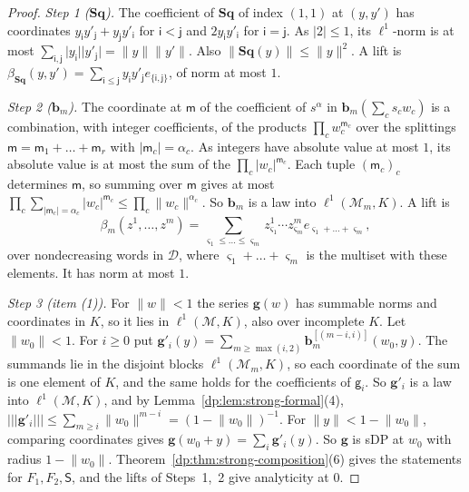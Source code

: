 \documentclass[11pt]{amsart}
\theoremstyle{definition}
\theoremstyle{remark}
\numberwithin{equation}{section}
\newcommand{\abs}[1]{\lvert #1\rvert}
\newcommand{\norm}[1]{\lVert #1\rVert}
\theoremstyle{plain}
\theoremstyle{definition}
\theoremstyle{plain}
\begin{document}
\begin{proof}
\emph{Step 1 ($\mathbf{Sq}$).} The coefficient of $\mathbf{Sq}$ of index $(1,1)$ at $(y,y')$ has coordinates $y_{\mathsf i}y'_{\mathsf j}+y_{\mathsf j}y'_{\mathsf i}$ for $\mathsf i<\mathsf j$ and $2y_{\mathsf i}y'_{\mathsf i}$ for $\mathsf i=\mathsf j$. As $\abs2\le1$, its $\ell^1$-norm is at most $\sum_{\mathsf i,\mathsf j}\abs{y_{\mathsf i}}\abs{y'_{\mathsf j}}=\norm y\norm{y'}$. Also $\norm{\mathbf{Sq}(y)}\le\norm y^2$. A lift is $\beta_{\mathbf{Sq}}(y,y')=\sum_{\mathsf i\le\mathsf j}y_{\mathsf i}y'_{\mathsf j}e_{\{\mathsf i,\mathsf j\}}$, of norm at most $1$.

\emph{Step 2 ($\mathbf b_m$).} The coordinate at $\mathsf m$ of the coefficient of $s^\alpha$ in $\mathbf b_m(\sum_cs_cw_c)$ is a combination, with integer coefficients, of the products $\prod_cw_c^{\mathsf m_c}$ over the splittings $\mathsf m=\mathsf m_1+\dots+\mathsf m_r$ with $\abs{\mathsf m_c}=\alpha_c$. As integers have absolute value at most $1$, its absolute value is at most the sum of the $\prod_c\abs{w_c}^{\mathsf m_c}$. Each tuple $(\mathsf m_c)_c$ determines $\mathsf m$, so summing over $\mathsf m$ gives at most $\prod_c\sum_{\abs{\mathsf m_c}=\alpha_c}\abs{w_c}^{\mathsf m_c}\le\prod_c\norm{w_c}^{\alpha_c}$. So $\mathbf b_m$ is a law into $\ell^1(\mathcal M_m,K)$. A lift is
\[
 \beta_m(z^1,\dots,z^m)=\sum_{\varsigma_1\le\dots\le\varsigma_m}z^1_{\varsigma_1}\cdots z^m_{\varsigma_m}e_{\varsigma_1+\dots+\varsigma_m},
\]
over nondecreasing words in $\mathcal D$, where $\varsigma_1+\dots+\varsigma_m$ is the multiset with these elements. It has norm at most $1$.

\emph{Step 3 (item (1)).} For $\norm w<1$ the series $\mathbf g(w)$ has summable norms and coordinates in $K$, so it lies in $\ell^1(\mathcal M,K)$, also over incomplete $K$. Let $\norm{w_0}<1$. For $i\ge0$ put $\mathbf g'_i(y)=\sum_{m\ge\max(i,2)}\mathbf b_m^{[(m-i,i)]}(w_0,y)$. The summands lie in the disjoint blocks $\ell^1(\mathcal M_m,K)$, so each coordinate of the sum is one element of $K$, and the same holds for the coefficients of $\mathsf g_i$. So $\mathbf g'_i$ is a law into $\ell^1(\mathcal M,K)$, and by Lemma~\ref{dp:lem:strong-formal}(4), $\lvert\!\lvert\!\lvert \mathbf g'_i\rvert\!\rvert\!\rvert\le\sum_{m\ge i}\norm{w_0}^{m-i}=(1-\norm{w_0})^{-1}$. For $\norm y<1-\norm{w_0}$, comparing coordinates gives $\mathbf g(w_0+y)=\sum_i\mathbf g'_i(y)$. So $\mathbf g$ is sDP at $w_0$ with radius $1-\norm{w_0}$. Theorem~\ref{dp:thm:strong-composition}(6) gives the statements for $F_1,F_2,\mathsf S$, and the lifts of Steps~1,~2 give analyticity at $0$.


\end{proof}
\end{document}
